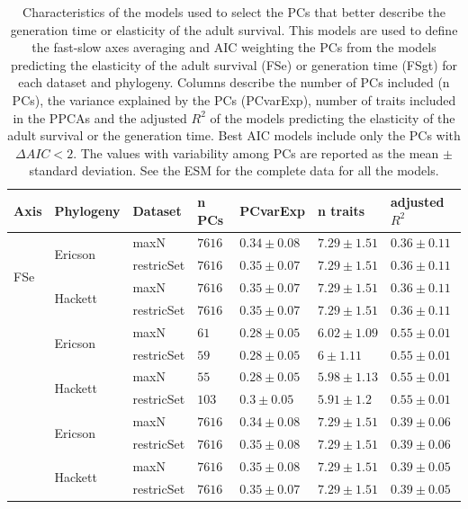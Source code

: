 \begin{table}[ht!]
\center
\caption[FS PCs models]{
Characteristics of the models used to select the PCs that better describe the
generation time or elasticity of the adult survival. This models are used to
define the fast-slow axes averaging and AIC weighting the PCs from the models
predicting the elasticity of the adult survival (FSe) or generation time (FSgt)
for each dataset and phylogeny. Columns describe the number of PCs included (n
PCs), the variance explained by the PCs (PCvarExp), number of traits included in
the PPCAs and the adjusted $R^{2}$ of the models predicting the elasticity of
the adult survival or the generation time. Best AIC models include only the PCs
with $\Delta AIC < 2$. The values with variability among PCs are reported as the
mean $\pm$ standard deviation. See the ESM for the complete data for all the
models.
}
\label{tab:tabApp2.1}
\begin{tabular}{@{}lllllll@{}}
\toprule
Axis & Phylogeny & Dataset & n PCs & PCvarExp & n traits & adjusted $R^{2}$\\
\midrule
\multirow{4}{*}{FSe} & \multirow{2}{*}{Ericson} & maxN & $7616$ & $0.34\pm0.08$ & $7.29\pm1.51$ & $0.36\pm0.11$\\
 &  & restricSet & $7616$ & $0.35\pm0.07$ & $7.29\pm1.51$ & $0.36\pm0.11$\\
 & \multirow{2}{*}{Hackett}& maxN & $7616$ & $0.35\pm0.07$ & $7.29\pm1.51$ & $0.36\pm0.11$\\
 &  & restricSet & $7616$ & $0.35\pm0.07$ & $7.29\pm1.51$ & $0.36\pm0.11$\\
\addlinespace
\multirow{4}{*}{FSe best AIC} & \multirow{2}{*}{Ericson} & maxN & $61$ &
$0.28\pm0.05$ & $6.02\pm1.09$ & $0.55\pm0.01$\\
 &  & restricSet & $59$ & $0.28\pm0.05$ & $6\pm1.11$ & $0.55\pm0.01$\\
 & \multirow{2}{*}{Hackett} & maxN & $55$ & $0.28\pm0.05$ & $5.98\pm1.13$ & $0.55\pm0.01$\\
 &  & restricSet & $103$ & $0.3\pm0.05$ & $5.91\pm1.2$ & $0.55\pm0.01$\\
\addlinespace
\multirow{4}{*}{FSgt} & \multirow{2}{*}{Ericson} & maxN & $7616$ & $0.34\pm0.08$ & $7.29\pm1.51$ & $0.39\pm0.06$\\
 &  & restricSet & $7616$ & $0.35\pm0.08$ & $7.29\pm1.51$ & $0.39\pm0.06$\\
 & \multirow{2}{*}{Hackett} & maxN & $7616$ & $0.35\pm0.08$ & $7.29\pm1.51$ & $0.39\pm0.05$\\
 &  & restricSet & $7616$ & $0.35\pm0.07$ & $7.29\pm1.51$ & $0.39\pm0.05$\\

\end{tabular}
\end{table}
